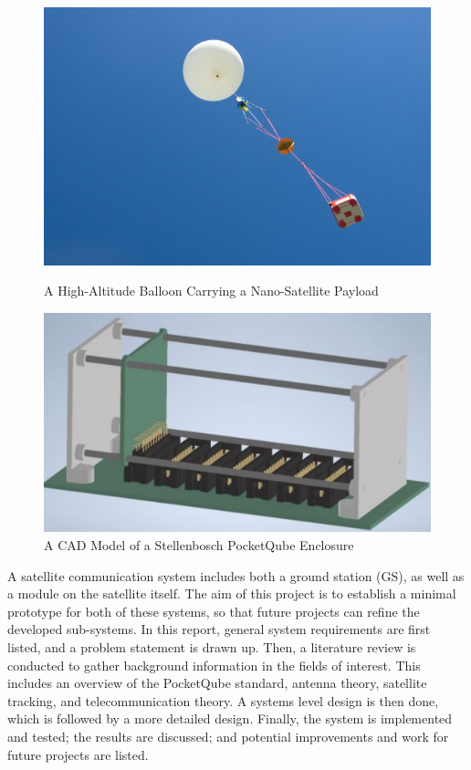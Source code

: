 \begin{figure}[!htb]
  \begin{minipage}{.49\textwidth}
    \centering
    \includegraphics[width=0.95\linewidth]{balloonSat}
    \caption{A High-Altitude Balloon Carrying a Nano-Satellite Payload \cite{site-cyberBalloonLaunch}}
    \label{fig:balloonSat}
  \end{minipage}
  \begin{minipage}{.49\textwidth}
    \centering
    \includegraphics[width=0.99\linewidth]{pq_enclosure}
    \caption{A CAD Model of a Stellenbosch PocketQube Enclosure \cite{standard-pqsu}}
    \label{fig:pq_enclosure}
  \end{minipage}
\end{figure}

A satellite communication system includes both a ground station (GS), as well as a module on the satellite itself. The aim of this project is to establish a minimal prototype for both of these systems, so that future projects can refine the developed sub-systems. In this report, general system requirements are first listed, and a problem statement is drawn up. Then, a literature review is conducted to gather background information in the fields of interest. This includes an overview of the PocketQube standard, antenna theory, satellite tracking, and telecommunication theory. A systems level design is then done, which is followed by a more detailed design. Finally, the system is implemented and tested; the results are discussed; and potential improvements and work for future projects are listed.